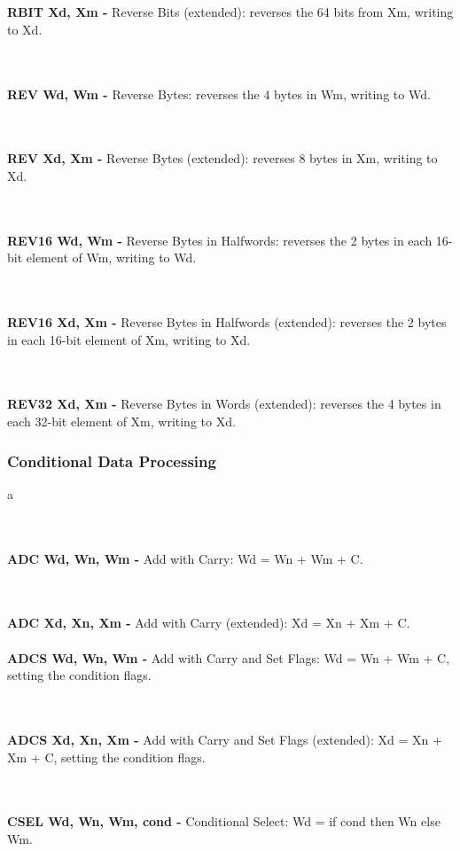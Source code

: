 \documentclass[12pt,a4paper,utf8]{ppgsi}
\begin{document}
\\\\\textbf{RBIT Xd, Xm -} Reverse Bits (extended): reverses the 64 bits from Xm, writing to Xd. 

\\\\\textbf{REV Wd, Wm -} Reverse Bytes: reverses the 4 bytes in Wm, writing to Wd. 

\\\\\textbf{REV Xd, Xm -} Reverse Bytes (extended): reverses 8 bytes in Xm, writing to Xd. 

\\\\\textbf{REV16 Wd, Wm -} Reverse Bytes in Halfwords: reverses the 2 bytes in each 16-bit element of Wm, writing to Wd. 

\\\\\textbf{REV16 Xd, Xm -} Reverse Bytes in Halfwords (extended): reverses the 2 bytes in each 16-bit element of Xm, writing to Xd. 

\\\\\textbf{REV32 Xd, Xm -} Reverse Bytes in Words (extended): reverses the 4 bytes in each 32-bit element of Xm, writing to Xd. 


\subsubsection{Conditional Data Processing}
a

\\\\\textbf{ADC Wd, Wn, Wm -} Add with Carry: Wd = Wn + Wm + C. 

\\\\\textbf{ADC Xd, Xn, Xm -} Add with Carry (extended): Xd = Xn + Xm + C. 
\\\\\textbf{ADCS Wd, Wn, Wm -} Add with Carry and Set Flags: Wd = Wn + Wm + C, setting the condition flags. 

\\\\\textbf{ADCS Xd, Xn, Xm -} Add with Carry and Set Flags (extended): Xd = Xn + Xm + C, setting the condition flags. 

\\\\\textbf{CSEL Wd, Wn, Wm, cond -} Conditional Select: Wd = if cond then Wn else Wm.
\end{document}
